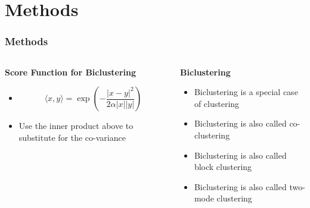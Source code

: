 \documentclass{beamer}
\begin{document}
\section{Methods}
\begin{frame}
    \frametitle{Methods}

    \begin{columns}
        \begin{column}{0.5\textwidth}
            \centering
            \textbf{Score Function for Biclustering}
            \begin{itemize}
                \item $$\langle x, y \rangle = \exp(-\frac{|x - y|^2}{2\alpha|x||y|})$$
                \item Use the inner product above to substitute for the co-variance
            \end{itemize}
        \end{column}
        \begin{column}{0.5\textwidth}
            \centering
            \textbf{Biclustering}
            \begin{itemize}
                \item Biclustering is a special case of clustering
                \item Biclustering is also called co-clustering
                \item Biclustering is also called block clustering
                \item Biclustering is also called two-mode clustering
            \end{itemize}
        \end{column}
    \end{columns}

\end{frame}
\end{document}
